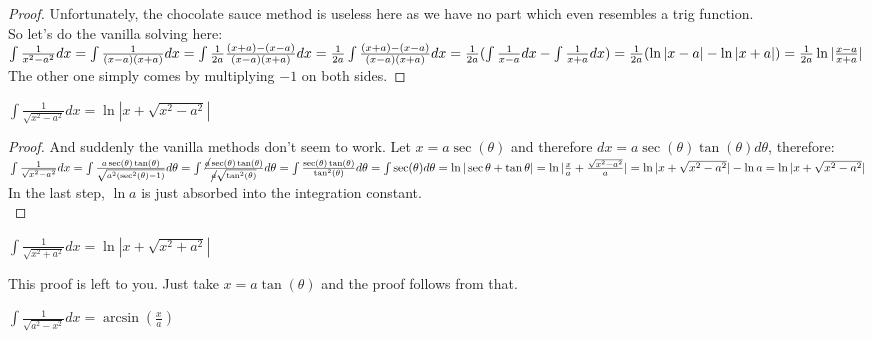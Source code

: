 \begin{proof}
    Unfortunately, the chocolate sauce method is useless here as we have no part which even resembles a trig function.\\
    So let's do the vanilla solving here:\\
    $
    \int \frac{1}{x^2-a^2} dx\\
    = \int \frac{1}{(x-a)(x+a)} dx\\
    = \int \frac{1}{2a} \frac{(x+a)-(x-a)}{(x-a)(x+a)} dx\\
    =  \frac{1}{2a} \int \frac{(x+a)-(x-a)}{(x-a)(x+a)} dx\\
    =  \frac{1}{2a} (\int \frac{1}{x-a} dx - \int \frac{1}{x+a} dx)\\
    =  \frac{1}{2a} (\ln{|x-a|} - \ln{|x+a|})\\
    = \frac{1}{2a} \ln{|\frac{x-a}{x+a}|}
    $
    The other one simply comes by multiplying $-1$ on both sides.
\end{proof}
\begin{theorem}
    $\int \frac{1}{\sqrt{x^2-a^2}} dx = \ln{|x+\sqrt{x^2-a^2}|}$
\end{theorem}
\begin{proof}
    And suddenly the vanilla methods don't seem to work. Let $x=a\sec(\theta)$ and therefore $dx=a\sec(\theta)\tan(\theta)d\theta$, therefore:\\
    $
    \int \frac{1}{\sqrt{x^2-a^2}} dx
    = \int \frac{a\sec(\theta)\tan(\theta)}{\sqrt{a^2(\sec^2(\theta)-1)}} d\theta \\
    = \int \frac{\cancel{a}\sec(\theta)\tan(\theta)}{\cancel{a}\sqrt{\tan^2(\theta)}} d\theta \\
    = \int \frac{\sec(\theta)\tan(\theta)}{\tan^2(\theta)} d\theta \\
    = \int \sec(\theta) d\theta \\
    = \ln{|\sec{\theta}+\tan{\theta}|}
    = \ln{|\frac{x}{a}+\frac{\sqrt{x^2-a^2}}{a}|}
    = \ln{|x+\sqrt{x^2-a^2}|} - \ln{a}
    =\ln{|x+\sqrt{x^2-a^2}|}
    $
    In the last step, $\ln{a}$ is just absorbed into the integration constant.\\
\end{proof}
\begin{theorem}
    $\int \frac{1}{\sqrt{x^2+a^2}} dx = \ln{|x+\sqrt{x^2+a^2}|}$
\end{theorem}
This proof is left to you. Just take $x=a\tan(\theta)$ and the proof follows from that.\\
\begin{theorem}
    $\int \frac{1}{\sqrt{a^2-x^2}} dx = \arcsin(\frac{x}{a})$
\end{theorem}

